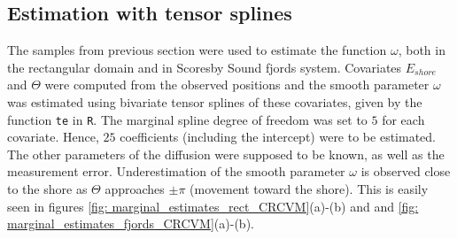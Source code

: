 \documentclass[11pt]{article}
\newcommand {\1}{\mathbb{1}}
\begin{document}

\subsection{Estimation with tensor splines}



The samples from previous section were used to estimate the function $\omega$, both in the rectangular domain and in Scoresby Sound fjords system. Covariates $E_{shore}$ and $\Theta$ were computed from the observed positions and the smooth parameter $\omega$ was estimated using bivariate tensor splines of these covariates, given by the function \texttt{te} in \texttt{R}. The marginal spline degree of freedom was set to $5$ for each covariate. Hence, $25$ coefficients (including the intercept) were to be estimated. The other parameters of the diffusion were supposed to be known, as well as the measurement error. Underestimation of the smooth parameter $\omega$ is observed close to the shore as $\Theta$ approaches $\pm \pi$ (movement toward the shore). This is easily seen in figures \ref{fig: marginal_estimates_rect_CRCVM}(a)-(b) and and \ref{fig: marginal_estimates_fjords_CRCVM}(a)-(b).
\end{document}
